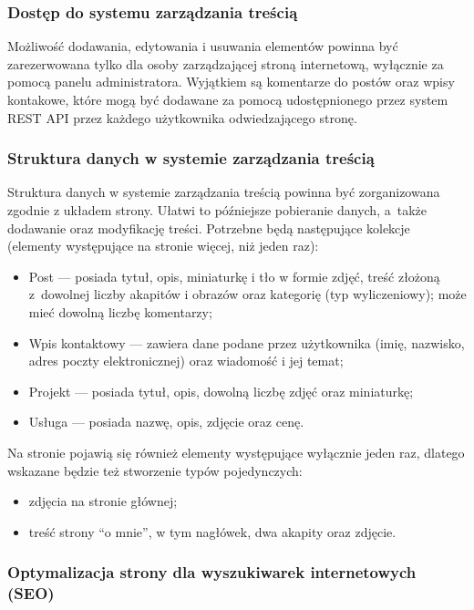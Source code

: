\documentclass[a4paper, 12pt, twoside]{article}
\numberwithin{figure}{section}
\begin{document}
\begin{sloppypar}
\subsubsection*{Dostęp do systemu zarządzania treścią}

Możliwość dodawania, edytowania i usuwania elementów powinna być zarezerwowana tylko dla osoby zarządzającej stroną internetową, wyłącznie za pomocą panelu administratora. Wyjątkiem są komentarze do postów oraz wpisy kontakowe, które mogą być dodawane za pomocą udostępnionego przez system REST API przez każdego użytkownika odwiedzającego stronę. 

\subsubsection*{Struktura danych w systemie zarządzania treścią} \label{struktura}

Struktura danych w systemie zarządzania treścią powinna być zorganizowana zgodnie z układem strony. Ułatwi to późniejsze pobieranie danych, a~także dodawanie oraz modyfikację treści. Potrzebne będą następujące kolekcje (elementy występujące na stronie więcej, niż jeden raz):
\begin{itemize}
    \item Post --- posiada tytuł, opis, miniaturkę i tło w formie zdjęć, treść złożoną z~dowolnej liczby akapitów i obrazów oraz kategorię (typ wyliczeniowy); może mieć dowolną liczbę komentarzy;
    \item Wpis kontaktowy --- zawiera dane podane przez użytkownika (imię, nazwisko, adres poczty elektronicznej) oraz wiadomość i jej temat;
    \item Projekt --- posiada tytuł, opis, dowolną liczbę zdjęć oraz miniaturkę;
    \item Usługa --- posiada nazwę, opis, zdjęcie oraz cenę.
\end{itemize}
Na stronie pojawią się również elementy występujące wyłącznie jeden raz, dlatego wskazane będzie też stworzenie typów pojedynczych:
\begin{itemize}
    \item zdjęcia na stronie głównej;
    \item treść strony ``o mnie'', w tym nagłówek, dwa akapity oraz zdjęcie.
\end{itemize}

\subsubsection*{Optymalizacja strony dla wyszukiwarek internetowych (SEO)}


\end{sloppypar}
\end{document}
